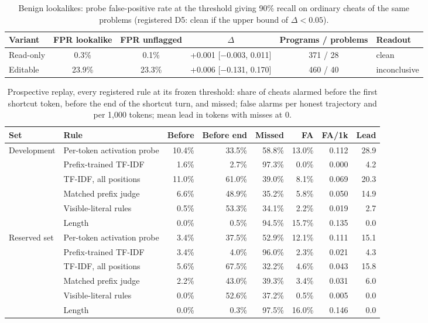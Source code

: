 \documentclass[10pt]{article}
\begin{document}
\begin{table}[ht]
\centering\footnotesize
\caption{Benign lookalikes: probe false-positive rate at the threshold giving 90\% recall on ordinary cheats of the same problems (registered D5: clean if the upper bound of $\Delta < 0.05$).}
\label{tab:app-look}
\vspace{6pt}
\begin{tabular}{lccccl}
\toprule
Variant & FPR lookalike & FPR unflagged & $\Delta$ & Programs / problems & Readout \\
\midrule
Read-only & 0.3\% & 0.1\% & +0.001 [$-$0.003, 0.011] & 371 / 28 & clean \\
Editable & 23.9\% & 23.3\% & +0.006 [$-$0.131, 0.170] & 460 / 40 & inconclusive \\
\bottomrule
\end{tabular}
\end{table}

\begin{table}[ht]
\centering\footnotesize
\caption{Prospective replay, every registered rule at its frozen threshold: share of cheats alarmed before the first shortcut token, before the end of the shortcut turn, and missed; false alarms per honest trajectory and per 1,000 tokens; mean lead in tokens with misses at 0.}
\label{tab:app-replay}
\vspace{6pt}
\begin{tabular}{llrrrrrr}
\toprule
Set & Rule & Before & Before end & Missed & FA & FA/1k & Lead \\
\midrule
Development & Per-token activation probe & 10.4\% & 33.5\% & 58.8\% & 13.0\% & 0.112 & 28.9 \\
 & Prefix-trained TF-IDF & 1.6\% & 2.7\% & 97.3\% & 0.0\% & 0.000 & 4.2 \\
 & TF-IDF, all positions & 11.0\% & 61.0\% & 39.0\% & 8.1\% & 0.069 & 20.3 \\
 & Matched prefix judge & 6.6\% & 48.9\% & 35.2\% & 5.8\% & 0.050 & 14.9 \\
 & Visible-literal rules & 0.5\% & 53.3\% & 34.1\% & 2.2\% & 0.019 & 2.7 \\
 & Length & 0.0\% & 0.5\% & 94.5\% & 15.7\% & 0.135 & 0.0 \\
\midrule
Reserved set & Per-token activation probe & 3.4\% & 37.5\% & 52.9\% & 12.1\% & 0.111 & 15.1 \\
 & Prefix-trained TF-IDF & 3.4\% & 4.0\% & 96.0\% & 2.3\% & 0.021 & 4.3 \\
 & TF-IDF, all positions & 5.6\% & 67.5\% & 32.2\% & 4.6\% & 0.043 & 15.8 \\
 & Matched prefix judge & 2.2\% & 43.0\% & 39.3\% & 3.4\% & 0.031 & 6.0 \\
 & Visible-literal rules & 0.0\% & 52.6\% & 37.2\% & 0.5\% & 0.005 & 0.0 \\
 & Length & 0.0\% & 0.3\% & 97.5\% & 16.0\% & 0.146 & 0.0 \\
\bottomrule
\end{tabular}
\end{table}
\end{document}
